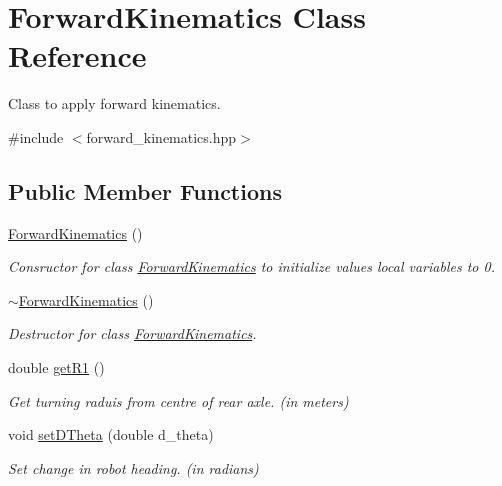 \hypertarget{classForwardKinematics}{}\section{Forward\+Kinematics Class Reference}
\label{classForwardKinematics}


Class to apply forward kinematics.  




{\ttfamily \#include $<$forward\+\_\+kinematics.\+hpp$>$}

\subsection*{Public Member Functions}
\begin{DoxyCompactItemize}
\item 
\hyperlink{classForwardKinematics_aff7ff4cb9cf2c523b111f2c5f2ec5cc8}{Forward\+Kinematics} ()
\begin{DoxyCompactList}\small\item\em Consructor for class \hyperlink{classForwardKinematics}{Forward\+Kinematics} to initialize values local variables to 0. \end{DoxyCompactList}\item 
\mbox{\label{classForwardKinematics_a78e9a1bc65b4262f88f0f1f60f2b6368}} 
\hyperlink{classForwardKinematics_a78e9a1bc65b4262f88f0f1f60f2b6368}{$\sim$\+Forward\+Kinematics} ()
\begin{DoxyCompactList}\small\item\em Destructor for class \hyperlink{classForwardKinematics}{Forward\+Kinematics}. \end{DoxyCompactList}\item 
double \hyperlink{classForwardKinematics_a6fdaaf30015b1628efed2407ea13c780}{get\+R1} ()
\begin{DoxyCompactList}\small\item\em Get turning raduis from centre of rear axle. (in meters) \end{DoxyCompactList}\item 
void \hyperlink{classForwardKinematics_ad4093b156610a520068844c7018a256e}{set\+D\+Theta} (double d\+\_\+theta)
\begin{DoxyCompactList}\small\item\em Set change in robot heading. (in radians) \end{DoxyCompactList}\item 

\end{DoxyCompactItemize}
